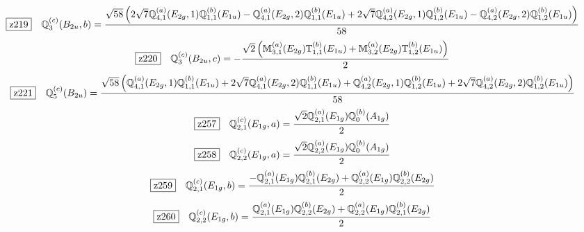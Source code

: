 \documentclass[fleqn,10pt,landscape]{jsarticle}
\begin{document}
\begin{dmath*}
\hspace*{3mm}\fbox{z219}\quad \mathbb{Q}_{3}^{(c)}(B_{2u},b)=\frac{\sqrt{58} \left(2 \sqrt{7} \mathbb{Q}_{4,1}^{(a)}(E_{2g},1) \mathbb{Q}_{1,1}^{(b)}(E_{1u}) - \mathbb{Q}_{4,1}^{(a)}(E_{2g},2) \mathbb{Q}_{1,1}^{(b)}(E_{1u}) + 2 \sqrt{7} \mathbb{Q}_{4,2}^{(a)}(E_{2g},1) \mathbb{Q}_{1,2}^{(b)}(E_{1u}) - \mathbb{Q}_{4,2}^{(a)}(E_{2g},2) \mathbb{Q}_{1,2}^{(b)}(E_{1u})\right)}{58}
\end{dmath*}
\begin{dmath*}
\hspace*{3mm}\fbox{z220}\quad \mathbb{Q}_{3}^{(c)}(B_{2u},c)=- \frac{\sqrt{2} \left(\mathbb{M}_{3,1}^{(a)}(E_{2g}) \mathbb{T}_{1,1}^{(b)}(E_{1u}) + \mathbb{M}_{3,2}^{(a)}(E_{2g}) \mathbb{T}_{1,2}^{(b)}(E_{1u})\right)}{2}
\end{dmath*}
\begin{dmath*}
\hspace*{3mm}\fbox{z221}\quad \mathbb{Q}_{5}^{(c)}(B_{2u})=\frac{\sqrt{58} \left(\mathbb{Q}_{4,1}^{(a)}(E_{2g},1) \mathbb{Q}_{1,1}^{(b)}(E_{1u}) + 2 \sqrt{7} \mathbb{Q}_{4,1}^{(a)}(E_{2g},2) \mathbb{Q}_{1,1}^{(b)}(E_{1u}) + \mathbb{Q}_{4,2}^{(a)}(E_{2g},1) \mathbb{Q}_{1,2}^{(b)}(E_{1u}) + 2 \sqrt{7} \mathbb{Q}_{4,2}^{(a)}(E_{2g},2) \mathbb{Q}_{1,2}^{(b)}(E_{1u})\right)}{58}
\end{dmath*}
\begin{dmath*}
\hspace*{3mm}\fbox{z257}\quad \mathbb{Q}_{2,1}^{(c)}(E_{1g},a)=\frac{\sqrt{2} \mathbb{Q}_{2,1}^{(a)}(E_{1g}) \mathbb{Q}_{0}^{(b)}(A_{1g})}{2}
\end{dmath*}
\begin{dmath*}
\hspace*{3mm}\fbox{z258}\quad \mathbb{Q}_{2,2}^{(c)}(E_{1g},a)=\frac{\sqrt{2} \mathbb{Q}_{2,2}^{(a)}(E_{1g}) \mathbb{Q}_{0}^{(b)}(A_{1g})}{2}
\end{dmath*}
\begin{dmath*}
\hspace*{3mm}\fbox{z259}\quad \mathbb{Q}_{2,1}^{(c)}(E_{1g},b)=\frac{- \mathbb{Q}_{2,1}^{(a)}(E_{1g}) \mathbb{Q}_{2,1}^{(b)}(E_{2g}) + \mathbb{Q}_{2,2}^{(a)}(E_{1g}) \mathbb{Q}_{2,2}^{(b)}(E_{2g})}{2}
\end{dmath*}
\begin{dmath*}
\hspace*{3mm}\fbox{z260}\quad \mathbb{Q}_{2,2}^{(c)}(E_{1g},b)=\frac{\mathbb{Q}_{2,1}^{(a)}(E_{1g}) \mathbb{Q}_{2,2}^{(b)}(E_{2g}) + \mathbb{Q}_{2,2}^{(a)}(E_{1g}) \mathbb{Q}_{2,1}^{(b)}(E_{2g})}{2}
\end{dmath*}
\end{document}
